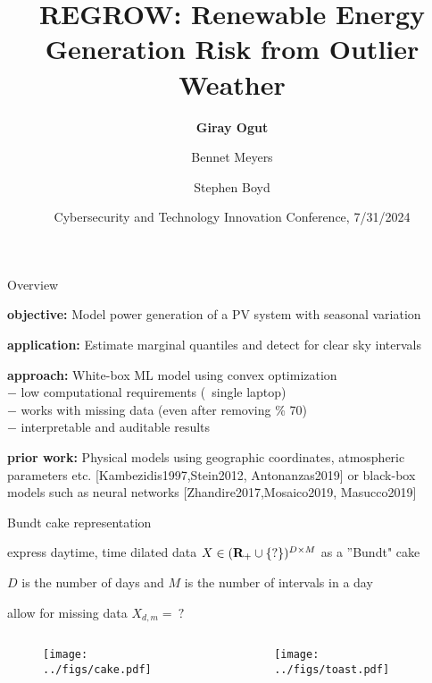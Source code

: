 \documentclass[aspectratio=169,11pt]{beamer}
\title{
REGROW: Renewable Energy Generation Risk from Outlier Weather
}
\author{\textbf{Giray Ogut} \and Bennet Meyers \and Stephen Boyd\\
}
\institute{\normalsize Stanford University}
\date{\small Cybersecurity and Technology Innovation Conference, 7/31/2024}
\begin{document}
\begin{frame}
\titlepage
\end{frame}

\begin{frame}{Overview}
\BIT
\item \textbf{objective:} Model power generation of a PV system with seasonal variation
\item \textbf{application:} Estimate marginal quantiles and detect for clear sky intervals
\item \textbf{approach:} White-box ML model using convex optimization \\
\hspace{12mm} $-$ low computational requirements (\eg \ single laptop) \\
\hspace{12mm} $-$ works with missing data (even after removing \% 70) \\
\hspace{12mm} $-$ interpretable and auditable results
\vspace{5mm}
\item \textbf{prior work:} Physical models using geographic coordinates, atmospheric parameters etc.
\small{[Kambezidis1997,Stein2012, Antonanzas2019]} or
black-box models such as neural networks \small{[Zhandire2017,Mosaico2019, Masucco2019]}  
\EIT
\end{frame}

\begin{frame}{Bundt cake representation}
\BIT
\item express daytime, time dilated data $X \in ({\mbox{\bf R}}_+ \cup \{?\})^{D \times M}$
as a ''Bundt" cake
\item $D$ is the number of days and $M$ is the number of intervals in a day
\item allow for missing data $X_{d,m} = \ ?$
\EIT
\vspace{-8mm}
	\begin{columns}
		\begin{column}{0.5\textwidth}
			\begin{figure}
				\centering
				\texttt{[image: ../figs/cake.pdf]}
			\end{figure}
		\end{column}
		\begin{column}{0.5\textwidth}
			\begin{figure}
				\centering
				\texttt{[image: ../figs/toast.pdf]}
			\end{figure}
		\end{column}
		\end{columns}
\end{frame}
\end{document}
